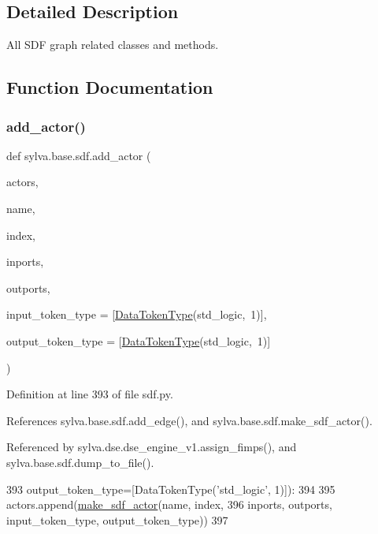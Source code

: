 \subsection{Detailed Description}
All S\+DF graph related classes and methods. 

\subsection{Function Documentation}
\mbox{\label{namespacesylva_1_1base_1_1sdf_a2fc075a9dc81209dee7a5b97d99640e5}} 
\subsubsection{\texorpdfstring{add\+\_\+actor()}{add\_actor()}}
{\footnotesize\ttfamily def sylva.\+base.\+sdf.\+add\+\_\+actor (\begin{DoxyParamCaption}\item[{}]{actors,  }\item[{}]{name,  }\item[{}]{index,  }\item[{}]{inports,  }\item[{}]{outports,  }\item[{}]{input\+\_\+token\+\_\+type = {\ttfamily \mbox{[}\hyperlink{classsylva_1_1base_1_1sdf_1_1_data_token_type}{Data\+Token\+Type}(\textquotesingle{}std\+\_\+logic\textquotesingle{},~1)\mbox{]}},  }\item[{}]{output\+\_\+token\+\_\+type = {\ttfamily \mbox{[}\hyperlink{classsylva_1_1base_1_1sdf_1_1_data_token_type}{Data\+Token\+Type}(\textquotesingle{}std\+\_\+logic\textquotesingle{},~1)\mbox{]}} }\end{DoxyParamCaption})}



Definition at line 393 of file sdf.\+py.



References sylva.\+base.\+sdf.\+add\+\_\+edge(), and sylva.\+base.\+sdf.\+make\+\_\+sdf\+\_\+actor().



Referenced by sylva.\+dse.\+dse\+\_\+engine\+\_\+v1.\+assign\+\_\+fimps(), and sylva.\+base.\+sdf.\+dump\+\_\+to\+\_\+file().


\begin{DoxyCode}
393                   output\_token\_type=[DataTokenType(\textcolor{stringliteral}{'std\_logic'}, 1)]):
394 
395         actors.append(\hyperlink{namespacesylva_1_1base_1_1sdf_a34a38a5853d86a6e49aba53f9040462d}{make\_sdf\_actor}(name, index,
396                                      inports, outports, input\_token\_type, output\_token\_type))
397 
\end{DoxyCode}
\mbox{\label{namespacesylva_1_1base_1_1sdf_aecda5e2c5810b35f98a0466a348af120}} 
